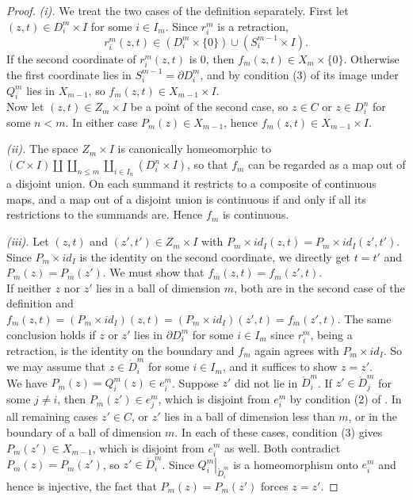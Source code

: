 \documentclass[11pt, a4paper, english]{article}
\newcommand{\interior}[1]{\mathring{#1}}
\renewcommand{\boundary}{\partial}
\newcommand{\restrict}[2]{\left.#1\right|_{#2}}
\newcommand{\openCell}[2]{e^{#1}_{#2}}
\theoremstyle{plain}
\theoremstyle{definition}
\theoremstyle{remark}
\numberwithin{equation}{section}
\numberwithin{theorem}{section}
\begin{document}
\begin{proof}
    \emph{(i).}
We treat the two cases of the definition separately. First let $(z,t) \in D_i^m \times I$ for some $i \in I_m$. Since $r_i^m$ is a retraction,
\[
    r_i^m(z,t) \in (D_i^m \times \{0\}) \cup (S_i^{m-1} \times I).
\]
If the second coordinate of $r_i^m(z,t)$ is $0$, then $f_m(z,t) \in X_m \times \{0\}$. Otherwise the first coordinate lies in $S_i^{m-1} = \boundary D_i^m$, and by condition (3) of  its image under $Q_i^m$ lies in $X_{m-1}$, so $f_m(z,t) \in X_{m-1} \times I$. \\
Now let $(z,t) \in Z_m \times I$ be a point of the second case, so $z \in C$ or $z \in D_i^n$ for some $n < m$. In either case $P_m(z) \in X_{m-1}$, hence $f_m(z,t) \in X_{m-1} \times I$.

    \emph{(ii).} 
The space $Z_{m} \times I$ is canonically homeomorphic to $(C \times I) \amalg \coprod_{n \le m} \coprod_{i\in I_n} (D_i^n \times I)$, so that $f_m$ can be regarded as a map out of a disjoint union. On each summand it restricts to a composite of continuous maps, and a map out of a disjoint union is continuous if and only if all its restrictions to the summands are. Hence $f_m$ is continuous.

    \emph{(iii).}
Let $(z,t)$ and $(z',t') \in Z_m \times I$ with $P_m \times id_I (z,t) = P_m \times id_I (z',t')$. Since $P_m \times id_I$ is the identity on the second coordinate, we directly get $t = t'$ and $P_m(z) = P_m(z')$. We must show that $f_m (z,t) = f_m (z',t)$. \\
If neither $z$ nor $z'$ lies in a ball of dimension $m$, both are in the second case of the definition and $f_m(z,t) = (P_m \times id_I)(z,t) = (P_m \times id_I)(z',t) = f_m(z',t)$. The same conclusion holds if $z$ or $z'$ lies in $\boundary D_i^m$ for some $i \in I_m$ since $r_i^m$, being a retraction, is the identity on the boundary and $f_m$ again agrees with $P_m \times id_I$. So we may assume that $z \in \interior D_i^m$ for some $i \in I_m$, and it suffices to show $z = z'$. \\
We have $P_m (z) = Q_i^m(z) \in \openCell{m}{i}$. Suppose $z'$ did not lie in $\interior D_i^m$. If $z' \in \interior D_j^m$ for some $j \ne i$, then $P_m(z') \in \openCell{m}{j}$, which is disjoint from $\openCell{m}{i}$ by condition (2) of . In all remaining cases $z' \in C$, or $z'$ lies in a ball of dimension less than $m$, or in the boundary of a ball of dimension $m$. In each of these cases, condition (3) gives $P_m(z') \in X_{m-1}$, which is disjoint from $\openCell{m}{i}$ as well. Both contradict $P_m(z) = P_m(z')$, so $z' \in \interior D_i^m$. Since $\restrict{Q_i^m}{\interior D_i^m}$ is a homeomorphism onto $\openCell{m}{i}$ and hence is injective, the fact that $P_m(z) = P_m(z')$ forces $z = z'$.
\end{proof}
\end{document}
